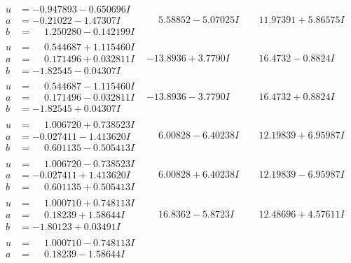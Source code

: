 \documentclass[1p]{elsarticle_modified}
\theoremstyle{definition}
\begin{document}
$$\begin{array}{c|c|c}
\begin{aligned}
u &= -0.947893 - 0.650696 I \\
a &= -0.21022 - 1.47307 I \\
b &= \phantom{-}1.250280 - 0.142199 I\end{aligned}
 & \phantom{-}5.58852 - 5.07025 I & \phantom{-}11.97391 + 5.86575 I \\ \hline\begin{aligned}
u &= \phantom{-}0.544687 + 1.115460 I \\
a &= \phantom{-}0.171496 + 0.032811 I \\
b &= -1.82545 - 0.04307 I\end{aligned}
 & -13.8936 + 3.7790 I & \phantom{-}16.4732 - 0.8824 I \\ \hline\begin{aligned}
u &= \phantom{-}0.544687 - 1.115460 I \\
a &= \phantom{-}0.171496 - 0.032811 I \\
b &= -1.82545 + 0.04307 I\end{aligned}
 & -13.8936 - 3.7790 I & \phantom{-}16.4732 + 0.8824 I \\ \hline\begin{aligned}
u &= \phantom{-}1.006720 + 0.738523 I \\
a &= -0.027411 - 1.413620 I \\
b &= \phantom{-}0.601135 - 0.505413 I\end{aligned}
 & \phantom{-}6.00828 - 6.40238 I & \phantom{-}12.19839 + 6.95987 I \\ \hline\begin{aligned}
u &= \phantom{-}1.006720 - 0.738523 I \\
a &= -0.027411 + 1.413620 I \\
b &= \phantom{-}0.601135 + 0.505413 I\end{aligned}
 & \phantom{-}6.00828 + 6.40238 I & \phantom{-}12.19839 - 6.95987 I \\ \hline\begin{aligned}
u &= \phantom{-}1.000710 + 0.748113 I \\
a &= \phantom{-}0.18239 + 1.58644 I \\
b &= -1.80123 + 0.03491 I\end{aligned}
 & \phantom{-}16.8362 - 5.8723 I & \phantom{-}12.48696 + 4.57611 I \\ \hline\begin{aligned}
u &= \phantom{-}1.000710 - 0.748113 I \\
a &= \phantom{-}0.18239 - 1.58644 I \\

\end{aligned}
\end{array}$$
\end{document}
